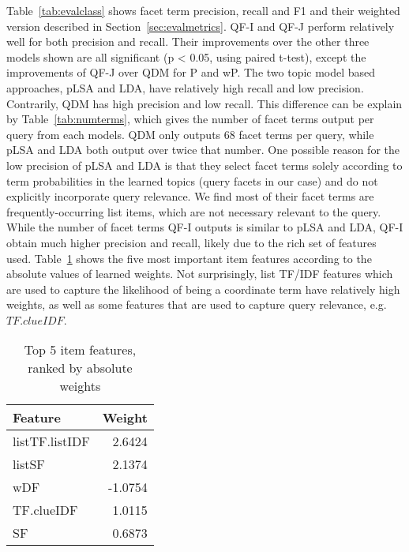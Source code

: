 Table~\ref{tab:evalclass} shows facet term precision, recall and F1 and their weighted version described in Section~\ref{sec:evalmetrics}.
QF-I and QF-J perform relatively well for both precision and recall.
Their improvements over the other three models shown are all significant (p < 0.05, using paired t-test), except the improvements of QF-J over QDM for P and wP.
The two topic model based approaches, pLSA and LDA, have relatively high recall and low precision.
Contrarily, QDM has high precision and low recall.
This difference can be explain by Table~\ref{tab:numterms}, which gives the number of facet terms output per query from each models.
QDM only outputs 68 facet terms per query, while pLSA and LDA both output over twice that number.
One possible reason for the low precision of pLSA and LDA is that they select facet terms solely according to term probabilities in the learned topics (query facets in our case) and do not explicitly incorporate query relevance.
We find most of their facet terms are frequently-occurring list items, which are not necessary relevant to the query.
While the number of facet terms QF-I outputs is similar to pLSA and LDA, QF-I obtain much higher precision and recall, likely due to the rich set of features used.
Table~\ref{tab:fweightst} shows the five most important item features according to the absolute values of learned weights.
Not surprisingly, list TF/IDF features which are used to capture the likelihood of being a coordinate term have relatively high weights,
as well as some features that are used to capture query relevance, e.g. $TF.clueIDF$.


\begin{table}[ht!]
\centering
\caption{Top 5 item features, ranked by absolute weights}
\label{tab:fweightst}
\begin{tabular}{|l|r|} \hline
Feature & Weight \\\hline
listTF.listIDF & 2.6424 \\ 
listSF & 2.1374 \\ 
wDF & -1.0754 \\ 
TF.clueIDF & 1.0115 \\ 
SF & 0.6873 \\ \hline 
\end{tabular}
\end{table}

